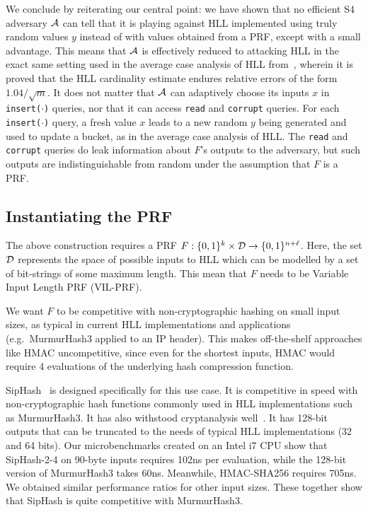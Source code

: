 \documentclass{article}
\begin{document}
We conclude by reiterating our central point: we have shown that no efficient S4 adversary ${\cal A}$ can tell that it is playing against HLL implemented using truly random values $y$ instead of with values obtained from a PRF, except with a small advantage. This means that ${\cal A}$ is effectively reduced to attacking HLL in the exact same setting used in the average case analysis of HLL from~\cite{hll}, wherein it is proved that the HLL cardinality estimate endures relative errors of the form $1.04/\sqrt{m}$. 
It does not matter that ${\cal A}$ can adaptively choose its inputs $x$ in \texttt{insert($\cdot$)} queries, nor that it can access \texttt{read} and \texttt{corrupt} queries. For each \texttt{insert($\cdot$)} query, a fresh value $x$ leads to a new random $y$ being generated and used to update a bucket, as in the average case analysis of HLL. The \texttt{read} and \texttt{corrupt} queries do leak information about $F$'s outputs to the adversary, but such outputs are indistinguishable from random under the assumption that $F$ is a PRF. 

\subsection{Instantiating the PRF}

The above construction requires a PRF $F: \{0,1\}^k \times {\cal D} \rightarrow  \{0,1\}^{n+\ell}$. Here, the set ${\cal D}$ represents the space of possible inputs to HLL which can be modelled by a set of bit-strings of some maximum length. This mean that $F$ needs to be Variable Input Length PRF (VIL-PRF). 

We want $F$ to be competitive with non-cryptographic hashing on small input sizes, as typical in current HLL implementations and applications (e.g.\ MurmurHash3 applied to an IP header). This makes off-the-shelf approaches like HMAC uncompetitive, since even for the shortest inputs, HMAC would require 4 evaluations of the underlying hash compression function.

SipHash~\cite{AumassonB12} is designed specifically for this use case. It is competitive in speed with non-cryptographic hash functions commonly used in HLL implementations such as MurmurHash3. It has also withstood cryptanalysis well~\cite{DobraunigMS14,XinLSL19}. It has 128-bit outputs that can be truncated to the needs of typical HLL implementations (32 and 64 bits). %
Our microbenchmarks created on an Intel i7 CPU show that SipHash-2-4 on 90-byte inputs requires 102ns per evaluation, while the 128-bit version of MurmurHash3 takes 60ns. Meanwhile, HMAC-SHA256 requires 705ns. We obtained similar performance ratios for other input sizes. These together show that SipHash is quite competitive with MurmurHash3.
\end{document}
